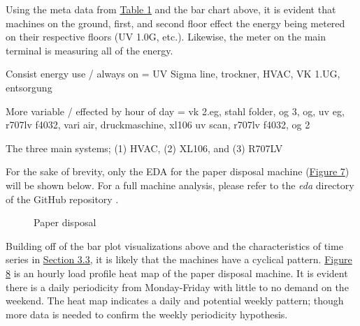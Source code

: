 Using the meta data from \hyperlink{table.1}{Table 1} and the bar chart above, it is evident that machines on the ground, first, and second floor effect the energy being metered on their respective floors (UV 1.0G, etc.). Likewise, the meter on the main terminal is measuring all of the energy. 

Consist energy use / always on = UV Sigma line, trockner, HVAC,  VK 1.UG, entsorgung


More variable / effected by hour of day = vk 2.eg, stahl folder, og 3,  og, uv eg, r707lv f4032, vari air, druckmaschine, xl106 uv scan, r707lv f4032, og 2


The three main systems; (1) HVAC, (2) XL106, and (3) R707LV 

For the sake of brevity, only the EDA for the paper disposal machine (\hyperlink{figure.6}{Figure 7}) will be shown below. For a full machine analysis, please refer to the \textit{eda} directory of the GitHub repository \cite{GitHub}. 

\begin{figure}[h]
  \centering
  \graphicspath{ {./images/} }
  \hfill
  \caption{Paper disposal}
\end{figure}

Building off of the bar plot visualizations above and the characteristics of time series in \hyperlink{subsection3.3}{Section 3.3}, it is likely that the machines have a cyclical pattern. \hyperlink{figure.8}{Figure 8} is an hourly load profile heat map of the paper disposal machine. It is evident there is a daily periodicity from Monday-Friday with little to no demand on the weekend. The heat map indicates a daily and potential weekly pattern; though more data is needed to confirm the weekly periodicity hypothesis. 

